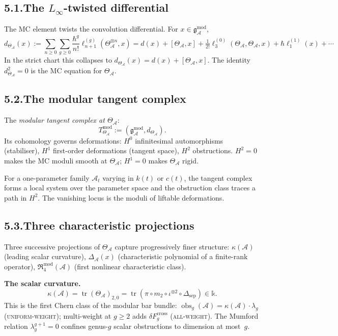 \documentclass[11pt,reqno]{amsart}
\theoremstyle{definition}
\theoremstyle{remark}
\providecommand{\cA}{\mathcal{A}}
\providecommand{\gAmod}{\mathfrak{g}^{\mathrm{mod}}_\cA}
\providecommand{\Bbbk}{\mathbb{k}}
\numberwithin{equation}{section}
\begin{document}
\subsection*{5.1.\enspace The $L_\infty$-twisted differential}

The MC element twists the convolution differential. For $x\in\gAmod$,
\[
d_{\Theta_\cA}(x):=\sum_{n\ge 0}\sum_{g\ge 0}\frac{\hbar^g}{n!}\ell_{n+1}^{(g)}(\Theta_\cA^{\otimes n},x)=d(x)+[\Theta_\cA,x]+\tfrac{1}{2!}\ell_3^{(0)}(\Theta_\cA,\Theta_\cA,x)+\hbar\ell_1^{(1)}(x)+\cdots
\]
In the strict chart this collapses to $d_{\Theta_\cA}(x)=d(x)+[\Theta_\cA,x]$.
The identity $d_{\Theta_\cA}^2=0$ is the MC equation for $\Theta_\cA$.

\subsection*{5.2.\enspace The modular tangent complex}

The \emph{modular tangent complex at $\Theta_\cA$}:
\[
T^{\mathrm{mod}}_{\Theta_\cA}:=(\gAmod,d_{\Theta_\cA}).
\]
Its cohomology governs deformations: $H^0$ infinitesimal automorphisms
(stabiliser), $H^1$ first-order deformations (tangent space), $H^2$
obstructions. $H^2=0$ makes the MC moduli smooth at $\Theta_\cA$;
$H^1=0$ makes $\Theta_\cA$ rigid.

For a one-parameter family $\cA_t$ varying in $k(t)$ or $c(t)$, the
tangent complex forms a local system over the parameter space and
the obstruction class traces a path in $H^2$. The vanishing locus
is the moduli of liftable deformations.

\subsection*{5.3.\enspace Three characteristic projections}

Three successive projections of $\Theta_\cA$ capture progressively
finer structure: $\kappa(\cA)$ (leading scalar curvature),
$\Delta_\cA(x)$ (characteristic polynomial of a finite-rank operator),
$\mathfrak R^{\mathrm{mod}}_4(\cA)$ (first nonlinear characteristic
class).

\medskip
\noindent\textbf{The scalar curvature.}\enspace
\[
\kappa(\cA)=\operatorname{tr}(\Theta_\cA)_{2,0}=\operatorname{tr}(\pi\circ m_2\circ\iota^{\otimes 2}\circ\Delta_{\mathrm{sep}})\in\Bbbk.
\]
This is the first Chern class of the modular bar bundle:
$\operatorname{obs}_g(\cA)=\kappa(\cA)\cdot\lambda_g$
\textsc{(uniform-weight)}; multi-weight at $g\ge 2$ adds
$\delta F_g^{\mathrm{cross}}$ \textsc{(all-weight)}. The Mumford relation
$\lambda_g^{g+1}=0$ confines genus-$g$ scalar obstructions to
dimension at most~$g$.
\end{document}
